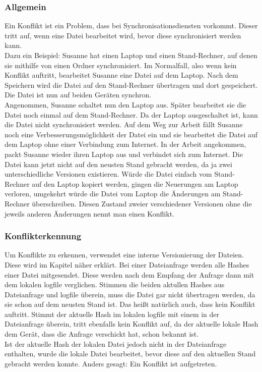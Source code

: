 \subsubsection{Allgemein}
Ein Konflikt ist ein Problem, dass bei Synchronisationsdiensten vorkommt. Dieser tritt auf, wenn eine Datei bearbeitet wird, bevor diese synchronisiert werden kann. \\
Dazu ein Beispiel: Susanne hat einen Laptop und einen Stand-Rechner, auf denen sie mithilfe von \sblit einen Ordner synchronisiert. Im Normalfall, also wenn kein Konflikt auftritt, bearbeitet Susanne eine Datei auf dem Laptop. Nach dem Speichern wird die Datei auf den Stand-Rechner übertragen und dort gespeichert. Die Datei ist nun auf beiden Geräten synchron.\\
Angenommen, Susanne schaltet nun den Laptop aus. Später bearbeitet sie die Datei noch einmal auf dem Stand-Rechner. Da der Laptop ausgeschaltet ist, kann die Datei nicht synchronisiert werden. Auf dem Weg zur Arbeit fällt Susanne noch eine Verbesserungsmöglichkeit der Datei ein und sie bearbeitet die Datei auf dem Laptop ohne einer Verbindung zum Internet. In der Arbeit angekommen, packt Susanne wieder ihren Laptop aus und verbindet sich zum Internet. Die Datei kann jetzt nicht auf den neusten Stand gebracht werden, da ja zwei unterschiedliche Versionen existieren. Würde die Datei einfach vom Stand-Rechner auf den Laptop kopiert werden, gingen die Neuerungen am Laptop verloren, umgekehrt würde die Datei vom Laptop die Änderungen am Stand-Rechner überschreiben. Diesen Zustand zweier verschiedener Versionen ohne die jeweils anderen Änderungen nennt man einen Konflikt.

\subsubsection{Konflikterkennung}\label{Konflikterkennung}
Um Konflikte zu erkennen, verwendet \sblit eine interne Versionierung der Dateien. Diese wird im Kapitel  näher erklärt. Bei einer Dateianfrage  werden alle Hashes einer Datei mitgesendet. Diese werden nach dem Empfang der Anfrage dann mit dem lokalen \gls{logfile} verglichen. Stimmen die beiden aktullen Hashes aus Dateianfrage und \gls{logfile} überein, muss die Datei gar nicht übertragen werden, da sie schon auf dem neusten Stand ist. Das heißt natürlich auch, dass kein Konflikt auftritt. Stimmt der aktuelle Hash im lokalen \gls{logfile} mit einem in der Dateianfrage überein, tritt ebenfalls kein Konflikt auf, da der aktuelle lokale Hash dem Gerät, dass die Anfrage verschickt hat, schon bekannt ist. \\
Ist der aktuelle Hash der lokalen Datei jedoch nicht in der Dateianfrage enthalten, wurde die lokale Datei bearbeitet, bevor diese auf den aktuellen Stand gebracht werden konnte. Anders gesagt: Ein Konflikt ist aufgetreten.

